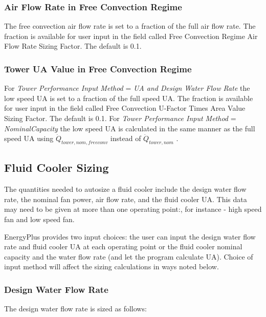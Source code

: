 \subsubsection{Air Flow Rate in Free Convection Regime}\label{air-flow-rate-in-free-convection-regime}

The free convection air flow rate is set to a fraction of the full air flow rate. The fraction is available for user input in the field called Free Convection Regime Air Flow Rate Sizing Factor. The default is 0.1.

\subsubsection{Tower UA Value in Free Convection Regime}\label{tower-ua-value-in-free-convection-regime}

For \emph{Tower Performance Input Method} = \emph{UA and Design Water Flow Rate} the low speed UA is set to a fraction of the full speed UA. The fraction is available for user input in the field called Free Convection U-Factor Times Area Value Sizing Factor. The default is 0.1. For \emph{Tower Performance Input Method} = \emph{NominalCapacity} the low speed UA is calculated in the same manner as the full speed UA using \(\dot Q_{tower,nom,freeconv}\) instead of \(\dot Q_{tower,nom}\) .

\subsection{Fluid Cooler Sizing}\label{fluid-cooler-sizing}

The quantities needed to autosize a fluid cooler include the design water flow rate, the nominal fan power, air flow rate, and the fluid cooler UA. This data may need to be given at more than one operating point:, for instance - high speed fan and low speed fan.

EnergyPlus provides two input choices: the user can input the design water flow rate and fluid cooler UA at each operating point or the fluid cooler nominal capacity and the water flow rate (and let the program calculate UA). Choice of input method will affect the sizing calculations in ways noted below.

\subsubsection{Design Water Flow Rate}\label{design-water-flow-rate-1}

The design water flow rate is sized as follows:

